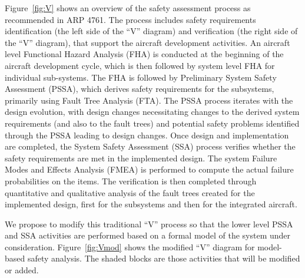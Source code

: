 
Figure~\ref{fig:V}  shows an overview of the safety assessment
process as recommended in ARP 4761. The process includes safety
requirements identification (the left side of the ``V'' diagram)
and verification (the right side of the ``V'' diagram), that
support the aircraft development activities. An aircraft level
Functional Hazard Analysis (FHA) is conducted at the beginning of
the aircraft development cycle, which is then followed by system
level FHA for individual sub-systems. The FHA is followed by
Preliminary System Safety Assessment (PSSA), which derives safety
requirements for the subsystems, primarily using Fault Tree
Analysis (FTA). The PSSA process iterates with the design
evolution, with design changes necessitating changes to the
derived system requirements (and also to the fault trees) and
potential safety problems identified through the PSSA leading to
design changes. Once design and implementation are completed, the
System Safety Assessment (SSA) process verifies whether the safety
requirements are met in the implemented design. The system Failure
Modes and Effects Analysis (FMEA) is performed to compute the
actual failure probabilities on the items. The verification is
then completed through quantitative and qualitative analysis of
the fault trees created for the implemented design, first for the
subsystems and then for the integrated aircraft.


We propose to modify this traditional ``V'' process so that the
lower level PSSA and SSA activities are performed based on a
formal model of the system under consideration.
Figure~\ref{fig:Vmod} shows the modified ``V'' diagram for
model-based safety analysis. The shaded blocks are those
activities that will be modified or added.

